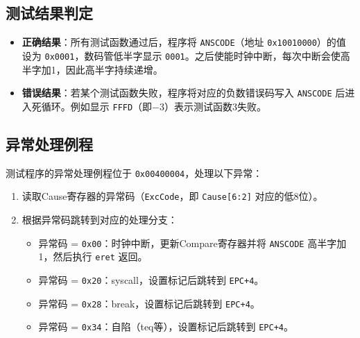 \subsection{测试结果判定}

\begin{itemize}[leftmargin=2em]
    \item \textbf{正确结果}：所有测试函数通过后，程序将 \texttt{ANSCODE}（地址 \texttt{0x10010000}）的值设为 \texttt{0x0001}，数码管低半字显示 \texttt{0001}。之后使能时钟中断，每次中断会使高半字加1，因此高半字持续递增。
    \item \textbf{错误结果}：若某个测试函数失败，程序将对应的负数错误码写入 \texttt{ANSCODE} 后进入死循环。例如显示 \texttt{FFFD}（即$-3$）表示测试函数3失败。
\end{itemize}

\subsection{异常处理例程}

测试程序的异常处理例程位于 \texttt{0x00400004}，处理以下异常：

\begin{enumerate}[leftmargin=2em]
    \item 读取Cause寄存器的异常码（\texttt{ExcCode}，即 \texttt{Cause[6:2]} 对应的低8位）。
    \item 根据异常码跳转到对应的处理分支：
    \begin{itemize}
        \item 异常码 = \texttt{0x00}：时钟中断，更新Compare寄存器并将 \texttt{ANSCODE} 高半字加1，然后执行 \texttt{eret} 返回。
        \item 异常码 = \texttt{0x20}：syscall，设置标记后跳转到 \texttt{EPC+4}。
        \item 异常码 = \texttt{0x28}：break，设置标记后跳转到 \texttt{EPC+4}。
        \item 异常码 = \texttt{0x34}：自陷（teq等），设置标记后跳转到 \texttt{EPC+4}。
    \end{itemize}
\end{enumerate}
